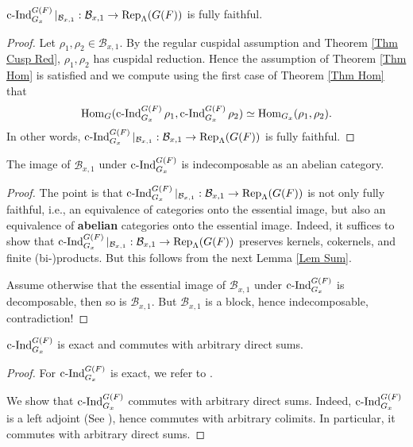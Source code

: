 	\begin{lemma}\label{Lem Thm Hom implies fully faithful}
		$\operatorname{\operatorname{c-Ind}}_{G_x}^{G(F)}|_{\mathcal{B}_{x,1}}: \mathcal{B}_{x,1} \to \operatorname{\operatorname{Rep}}_{\Lambda}(G(F))$ is fully faithful.
	\end{lemma}
	
	\begin{proof}
		Let $\rho_1, \rho_2 \in \mathcal{B}_{x,1}$. By the regular cuspidal assumption and Theorem \ref{Thm Cusp Red}, $\rho_1, \rho_2$ has cuspidal reduction. Hence the assumption of Theorem \ref{Thm Hom} is satisfied and we compute using the first case of Theorem \ref{Thm Hom} that
		$$\operatorname{\operatorname{Hom}}_G(\operatorname{\operatorname{c-Ind}}_{G_x}^{G(F)}\rho_1, \operatorname{\operatorname{c-Ind}}_{G_x}^{G(F)}\rho_2) \simeq \operatorname{\operatorname{Hom}}_{G_x}(\rho_1, \rho_2).$$
		In other words, $\operatorname{\operatorname{c-Ind}}_{G_x}^{G(F)}|_{\mathcal{B}_{x,1}}: \mathcal{B}_{x,1} \to \operatorname{\operatorname{Rep}}_{\Lambda}(G(F))$ is fully faithful.
	\end{proof}
	
	\begin{lemma}\label{Lem Indec}
		The image of $\mathcal{B}_{x,1}$ under $\operatorname{\operatorname{c-Ind}}_{G_x}^{G(F)}$ is indecomposable as an abelian category.
	\end{lemma}
	
	\begin{proof}
		The point is that $\operatorname{\operatorname{c-Ind}}_{G_x}^{G(F)}|_{\mathcal{B}_{x,1}}: \mathcal{B}_{x,1} \to \operatorname{\operatorname{Rep}}_{\Lambda}(G(F))$ is not only fully faithful, i.e., an equivalence of categories onto the essential image, but also an equivalence of \textbf{abelian} categories onto the essential image. Indeed, it suffices to show that $\operatorname{\operatorname{c-Ind}}_{G_x}^{G(F)}|_{\mathcal{B}_{x,1}}: \mathcal{B}_{x,1} \to \operatorname{\operatorname{Rep}}_{\Lambda}(G(F))$ preserves kernels, cokernels, and finite (bi-)products. But this follows from the next Lemma \ref{Lem Sum}.
		
		Assume otherwise that the essential image of $\mathcal{B}_{x,1}$ under $\operatorname{\operatorname{c-Ind}}_{G_x}^{G(F)}$ is decomposable, then so is $\mathcal{B}_{x,1}$. But $\mathcal{B}_{x,1}$ is a block, hence indecomposable, contradiction!
	\end{proof}
	
	\begin{lemma}\label{Lem Sum}
		$\operatorname{\operatorname{c-Ind}}_{G_x}^{G(F)}$ is exact and commutes with arbitrary direct sums.
	\end{lemma}
	
	\begin{proof}
		For $\operatorname{\operatorname{c-Ind}}_{G_x}^{G(F)}$ is exact, we refer to \cite[I.5.10]{vigneras1996representations}.
		
		We show that $\operatorname{\operatorname{c-Ind}}_{G_x}^{G(F)}$ commutes with arbitrary direct sums. Indeed, $\operatorname{\operatorname{c-Ind}}_{G_x}^{G(F)}$ is a left adjoint (See \cite[I.5.7]{vigneras1996representations}), hence commutes with arbitrary colimits. In particular, it commutes with arbitrary direct sums.
	\end{proof}
	
